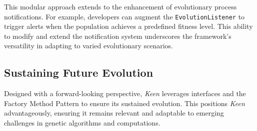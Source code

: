     This modular approach extends to the enhancement of evolutionary process
    notifications. For example, developers can augment the
    \texttt{EvolutionListener} to trigger alerts when the population achieves a
    predefined fitness level. This ability to modify and extend the notification
    system underscores the framework's versatility in adapting to varied
    evolutionary scenarios.

  \subsection{Sustaining Future Evolution}
    Designed with a forward-looking perspective, \textit{Keen} leverages 
    interfaces and the Factory Method Pattern to ensure its sustained 
    evolution. This positions \textit{Keen} advantageously, ensuring it remains 
    relevant and adaptable to emerging challenges in genetic algorithms and 
    computations.
